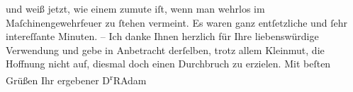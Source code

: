                     und weiß jetzt, wie einem zumute iſt, wenn man wehrlos im Maſchinengewehrfeuer
                    zu ſtehen vermeint. Es waren ganz entſetzliche und ſehr intereſſante Minuten.
                    –\pend
           \pstart
           Ich danke Ihnen herzlich für Ihre liebenswürdige Verwendung und gebe in
                    Anbetracht derſelben, trotz allem Kleinmut, die Hoffnung nicht auf, diesmal doch
                    einen Durchbruch zu erzielen.\pend
           \pstart
           Mit beſten Grüßen Ihr ergebener\pend
           \pstart \spacefill\mbox{D\textsuperscript{r}RAdam}\pend{}\endnumbering{}  
      